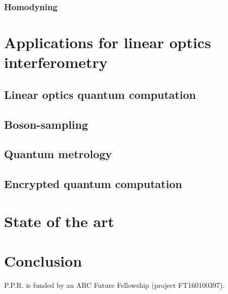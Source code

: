 \documentclass[aps,rmp,twocolumn,amsmath,amssymb,nofootinbib,superscriptaddress]{revtex4}
\newcommand{\comment}[1]{{\color{blue}{#1}}}
\begin{document}
\comment{Discuss number-resolved and bucket detectors, multiplexed detection, APDs, current micropillar detectors}

\subsubsection{Homodyning}

\section{Applications for linear optics interferometry}

\subsection{Linear optics quantum computation}

\subsection{Boson-sampling}

\subsection{Quantum metrology}

\comment{Discuss NOON states - Heisenberg limited}

\comment{Discuss MORDOR scheme}

\subsection{Encrypted quantum computation}

\section{State of the art}

\comment{Discuss where experiments are at at the moment}

\section{Conclusion}

%
%

\begin{acknowledgments}
P.P.R. is funded by an ARC Future Fellowship (project FT160100397).
\end{acknowledgments}

%
%


\end{document}
